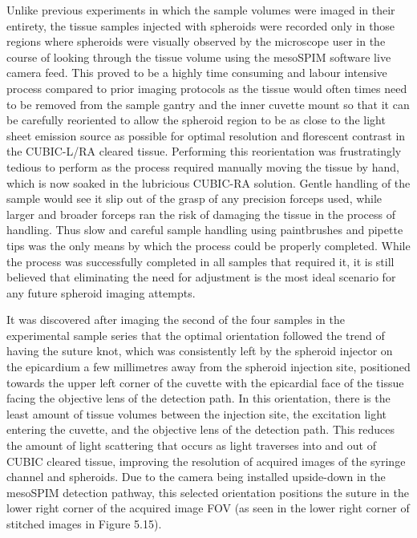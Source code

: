 Unlike previous experiments in which the sample volumes were imaged in their entirety, the tissue samples injected with spheroids were recorded only in those regions where spheroids were visually observed by the microscope user in the course of looking through the tissue volume using the mesoSPIM software live camera feed. This proved to be a highly time consuming and labour intensive process compared to prior imaging protocols as the tissue would often times need to be removed from the sample gantry and the inner cuvette mount so that it can be carefully reoriented to allow the spheroid region to be as close to the light sheet emission source as possible for optimal resolution and florescent contrast in the CUBIC-L/RA cleared tissue. Performing this reorientation was frustratingly tedious to perform as the process required manually moving the tissue by hand, which is now soaked in the lubricious CUBIC-RA solution. Gentle handling of the sample would see it slip out of the grasp of any precision forceps used, while larger and broader forceps ran the risk of damaging the tissue in the process of handling. Thus slow and careful sample handling using paintbrushes and pipette tips was the only means by which the process could be properly completed. While the process was successfully completed in all samples that required it, it is still believed that eliminating the need for adjustment is the most ideal scenario for any future spheroid imaging attempts.

It was discovered after imaging the second of the four samples in the experimental sample series that the optimal orientation followed the trend of having the suture knot, which was consistently left by the spheroid injector on the epicardium a few millimetres away from the spheroid injection site, positioned towards the upper left corner of the cuvette with the epicardial face of the tissue facing the objective lens of the detection path. In this orientation, there is the least amount of tissue volumes between the injection site, the excitation light entering the cuvette, and the objective lens of the detection path. This reduces the amount of light scattering that occurs as light traverses into and out of CUBIC cleared tissue, improving the resolution of acquired images of the syringe channel and spheroids. Due to the camera being installed upside-down in the mesoSPIM detection pathway, this selected orientation positions the suture in the lower right corner of the acquired image FOV (as seen in the lower right corner of stitched images in Figure 5.15). 

